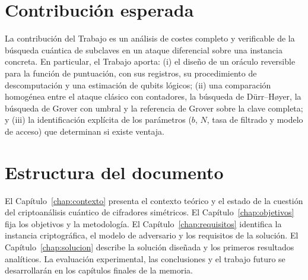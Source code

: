 \section{Contribución esperada}

La contribución del Trabajo es un análisis de costes completo y verificable de la búsqueda cuántica de subclaves en un ataque diferencial sobre una instancia concreta. En particular, el Trabajo aporta: (i) el diseño de un oráculo reversible para la función de puntuación, con sus registros, su procedimiento de descomputación y una estimación de qubits lógicos; (ii) una comparación homogénea entre el ataque clásico con contadores, la búsqueda de Dürr--Høyer, la búsqueda de Grover con umbral y la referencia de Grover sobre la clave completa; y (iii) la identificación explícita de los parámetros (\(b\), \(N\), tasa de filtrado y modelo de acceso) que determinan si existe ventaja.

\section{Estructura del documento}

El Capítulo~\ref{chap:contexto} presenta el contexto teórico y el estado de la cuestión del criptoanálisis cuántico de cifradores simétricos. El Capítulo~\ref{chap:objetivos} fija los objetivos y la metodología. El Capítulo~\ref{chap:requisitos} identifica la instancia criptográfica, el modelo de adversario y los requisitos de la solución. El Capítulo~\ref{chap:solucion} describe la solución diseñada y los primeros resultados analíticos. La evaluación experimental, las conclusiones y el trabajo futuro se desarrollarán en los capítulos finales de la memoria.
